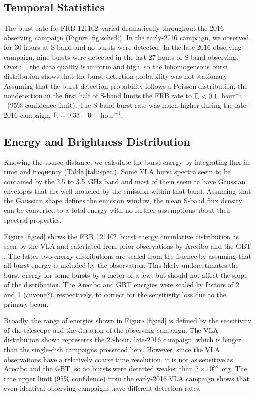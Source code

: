 \documentclass[twocolumn]{aastex61}
\newcommand{\frb}{FRB 121102}
\begin{document}
\subsection{Temporal Statistics}
\label{sec:temp}

The burst rate for \frb\ varied dramatically throughout the 2016 observing campaign (Figure \ref{fig:sched}). In the early-2016 campaign, we observed for 30 hours at S-band and no bursts were detected. In the late-2016 observing campaign, nine bursts were detected in the last 27 hours of S-band observing. Overall, the data quality is uniform and high, so the inhomogeneous burst distribution shows that the burst detection probability was not stationary. Assuming that the burst detection probability follows a Poisson distribution, the nondetection in the first half of S-band limits the FRB rate to $\rm{R}<0.1$\ hour$^{-1}$\ (95\% confidence limit). The S-band burst rate was much higher during the late-2016 campaign, $\rm{R}=0.33\pm0.1$\ hour$^{-1}$.

\subsection{Energy and Brightness Distribution}
\label{sec:disn}

Knowing the source distance, we calculate the burst energy by integrating flux in time and frequency (Table \ref{tab:spec}). Some VLA burst spectra seem to be contained by the 2.5 to 3.5~GHz band and most of them seem to have Gaussian envelopes that are well modeled by the emission within that band. Assuming that the Gaussian shape defines the emission window, the mean S-band flux density can be converted to a total energy with no further assumptions about their spectral properties.

Figure \ref{fig:ed} shows the \frb\ burst energy cumulative distribution as seen by the VLA and calculated from prior observations by Arecibo and the GBT \citep{2016Natur.531..202S,2016arXiv160308880S}. The latter two energy distributions are scaled from the fluence by assuming that all burst energy is included by the observation. This likely underestimates the burst energy for some bursts by a factor of a few, but should not affect the slope of the distribution. The Arecibo and GBT energies were scaled by factors of {\color{red} 2 and 1 (anyone?)}, respectively, to correct for the sensitivity loss due to the primary beam.

Broadly, the range of energies shown in Figure \ref{fig:ed} is defined by the sensitivity of the telescope and the duration of the observing campaign. The VLA distribution shown represents the 27-hour, late-2016 campaign, which is longer than the single-dish campaigns presented here. However, since the VLA observations have a relatively coarse time resolution, it is not as sensitive as Arecibo and the GBT, so no bursts were detected weaker than $3\times10^{38}$~erg. The rate upper limit (95\% confidence) from the early-2016 VLA campaign shows that even identical observing campaigns have different detection rates.
\end{document}
